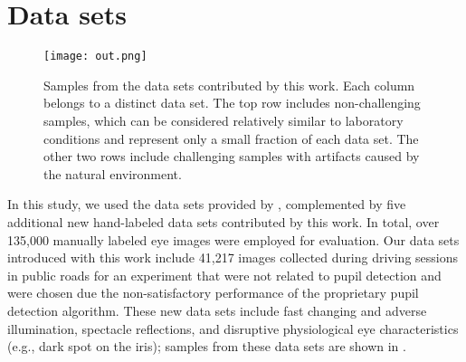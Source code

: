 \section{Data sets}
\label{sec:newdata}
\begin{figure}[h]
	\begin{center}
		\texttt{[image: out.png]}
		\caption{
			Samples from the data sets contributed by this work.
			Each column belongs to a distinct data set.
			The top row includes non-challenging samples, which can be
			considered relatively similar to laboratory conditions and represent
			only a small fraction of each data set.
			The other two rows include challenging samples with artifacts caused
			by the natural environment.
		}
		\label{fig:newdatasets}
	\end{center}
\end{figure}
In this study, we used the data sets provided by
\citet{fuhl2015excuse,fuhl2015else}, complemented by five additional
new hand-labeled data sets contributed by this work. In total, over 135,000 manually labeled eye images were employed for evaluation. Our data sets introduced with this work include 41,217 images collected during driving sessions
in public roads for an experiment \citet{kasneci2013towards} that were not related to pupil
detection and were chosen due the non-satisfactory performance of the
proprietary pupil detection algorithm.
These new data sets include fast changing and adverse illumination, spectacle
reflections, and disruptive physiological eye characteristics (e.g., dark spot
on the iris); samples from these data sets are shown in
.
